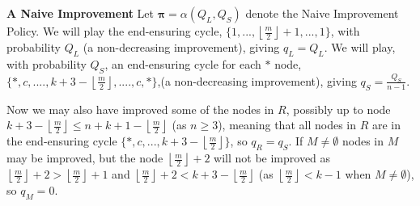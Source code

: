 \documentclass[a4paper,10pt]{article}
\newcommand{\halflength}{\ensuremath{\floor{\frac{m}{2}}}}
\newcommand{\floor}[1]{\left \lfloor #1 \right \rfloor}
\theoremstyle{definition}
\theoremstyle{definition}
\theoremstyle{remark}
\theoremstyle{definition}
\begin{document}
\textbf{A Naive Improvement}
Let $\bm{\pi}=\alpha(Q_{L},Q_{S})$ denote the Naive Improvement Policy.
We will play the end-ensuring cycle, $\{1,...,\floor{\frac{m}{2}}+1,...,1\}$, with probability $Q_{L}$ (a non-decreasing improvement), giving $q_{L}=Q_{L}$. We will play,  with probability $Q_{S}$, an end-ensuring cycle for each $*$ node, $\{*,c,....,k+3-\floor{\frac{m}{2}},....,c,* \}$,(a non-decreasing improvement), giving $q_{S}=\frac{Q_{S}}{n-1}$.
 
Now we may also have improved some of the nodes in $R$, possibly up to node $k+3-\floor{\frac{m}{2}} \leq n+k+1-\floor{\frac{m}{2}}$ (as $n \geq 3$), meaning that all nodes in $R$ are in the end-ensuring cycle $\{*,c,...,k+3-\floor{\frac{m}{2}} \}$, so $q_{R}=q_{S}$. If $M \neq \emptyset$ nodes in $M$ may be improved, but the node $\halflength +2$ will not be improved as  $\halflength +2 > \halflength +1$ and $\halflength +2 < k+3- \halflength$ (as $\halflength < k-1$ when $M \neq \emptyset$), so $q_{M}=0$.
\end{document}
